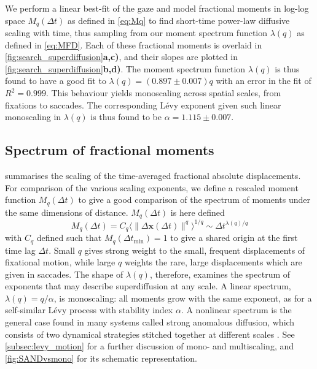 We perform a linear best-fit of the gaze and model fractional moments in log-log space $M_q(\Delta t)$ as defined in \cref{eq:Mq} to find short-time power-law diffusive scaling with time, thus sampling from our moment spectrum function $\lambda(q)$ as defined in \cref{eq:MFD}. Each of these fractional moments is overlaid in \cref{fig:search_superdiffusion}\textbf{a,c)}, and their slopes are plotted in \cref{fig:search_superdiffusion}\textbf{b,d)}. The moment spectrum function $\lambda(q)$ is thus found to have a good fit to $\lambda(q) = (0.897 \pm 0.007)q$ with an error in the fit of $R^2 = 0.999$. This behaviour yields monoscaling across spatial scales, from fixations to saccades. The corresponding Lévy exponent given such linear monoscaling in $\lambda(q)$ is thus found to be $\alpha = 1.115 \pm 0.007$.
\subsection{Spectrum of fractional moments}\label{subsec:spectrum_of_fractional_moments}
 summarises the scaling of the time-averaged fractional absolute displacements. For comparison of the various scaling exponents, we define a rescaled moment function $M_q(\Delta t)$ to give a good comparison of the spectrum of moments under the same dimensions of distance. $M_q(\Delta t)$ is here defined
\begin{equation} \label{eq:Mq}
    M_q(\Delta t) = C_q \langle \|\Delta\mathbf{x}(\Delta t)\|^{q} \rangle^{1/q} \sim \Delta t^{\lambda(q) / q}
\end{equation}
with $C_q$ defined such that $M_q(\Delta t_{\text{min}})=1$ to give a shared origin at the first time lag $\Delta t$. Small $q$ gives strong weight to the small, frequent displacements of fixational motion, while large $q$ weights the rare, large displacements which are given in saccades. The shape of $\lambda(q)$, therefore, examines the spectrum of exponents that may describe superdiffusion at any scale. A linear spectrum, $\lambda(q) = q/\alpha$, is monoscaling: all moments grow with the same exponent, as for a self-similar Lévy process with stability index $\alpha$. A nonlinear spectrum is the general case found in many systems called strong anomalous diffusion, which consists of two dynamical strategies stitched together at different scales \cite{vilk_strong_2025, cagnetta_strong_2015, castiglione_strong_1999, wang_strong_2020}. See \cref{subsec:levy_motion} for a further discussion of mono- and multiscaling, and \cref{fig:SANDvsmono} for its schematic representation.

